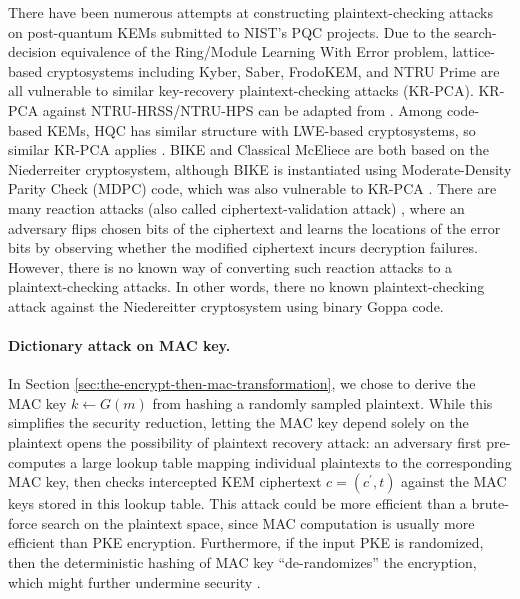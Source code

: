 \documentclass[runningheads]{llncs}
\begin{document}
There have been numerous attempts at constructing plaintext-checking attacks on post-quantum KEMs submitted to NIST's PQC projects. Due to the search-decision equivalence of the Ring/Module Learning With Error problem, lattice-based cryptosystems including Kyber, Saber, FrodoKEM, and NTRU Prime are all vulnerable to similar key-recovery plaintext-checking attacks (KR-PCA)\cite{DBLP:conf/crypto/00010N20,DBLP:journals/tches/RaviRCB20,DBLP:journals/tches/UenoXTITH22,DBLP:journals/tches/TanakaUXITH23}. KR-PCA against NTRU-HRSS/NTRU-HPS can be adapted from \cite{Hoffstein1999,DBLP:conf/crypto/JaulmesJ00,cryptoeprint:2019/1022,cryptoeprint:2021/168}. Among code-based KEMs, HQC has similar structure with LWE-based cryptosystems, so similar KR-PCA applies \cite{DBLP:conf/acns/Huguenin-Dumittan20}. BIKE and Classical McEliece are both based on the Niederreiter cryptosystem, although BIKE is instantiated using Moderate-Density Parity Check (MDPC) code, which was also vulnerable to KR-PCA \cite{DBLP:conf/asiacrypt/Guo0S16}. There are many reaction attacks (also called ciphertext-validation attack) \cite{DBLP:conf/icics/HallGS99}, where an adversary flips chosen bits of the ciphertext and learns the locations of the error bits by observing whether the modified ciphertext incurs decryption failures. However, there is no known way of converting such reaction attacks to a plaintext-checking attacks. In other words, there no known plaintext-checking attack against the Niedereitter cryptosystem using binary Goppa code.

\paragraph{Dictionary attack on MAC key.} In Section \ref{sec:the-encrypt-then-mac-transformation}, we chose to derive the MAC key $k \leftarrow G(m)$ from hashing a randomly sampled plaintext. While this simplifies the security reduction, letting the MAC key depend solely on the plaintext opens the possibility of plaintext recovery attack: an adversary first pre-computes a large lookup table mapping individual plaintexts to the corresponding MAC key, then checks intercepted KEM ciphertext $c = (c^\prime, t)$ against the MAC keys stored in this lookup table. This attack could be more efficient than a brute-force search on the plaintext space, since MAC computation is usually more efficient than PKE encryption. Furthermore, if the input PKE is randomized, then the deterministic hashing of MAC key ``de-randomizes'' the encryption, which might further undermine security \cite{cryptoeprint:2021/912}.
\end{document}
